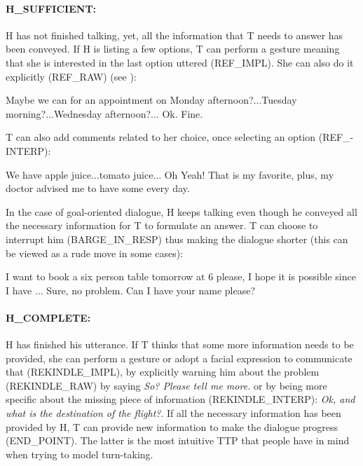                    	\paragraph{H\_SUFFICIENT:} H has not finished talking, yet, all the information that T needs to answer has been conveyed. If H is listing a few options, T can perform a gesture meaning that she is interested in the last option uttered (REF\_IMPL). She can also do it explicitly (REF\_RAW) (see \cite{El-Asri2014a}):
                    
                    	\begin{dialogue}
							 Maybe we can for an appointment on Monday afternoon?...Tuesday morning?...Wednesday afternoon?...
							 Ok. Fine.
						\end{dialogue}
                        
                   	T can also add comments related to her choice, once selecting an option (REF\_-\\INTERP):
                    
                    	\begin{dialogue}
							 We have apple juice...tomato juice...
							 Oh Yeah! That is my favorite, plus, my doctor advised me to have some every day.
						\end{dialogue}
                    
                    In the case of goal-oriented dialogue, H keeps talking even though he conveyed all the necessary information for T to formulate an answer. T can choose to interrupt him (BARGE\_IN\_RESP) thus making the dialogue shorter (this can be viewed as a rude move in some cases):
                    
                 		\begin{dialogue}
							 I want to book a six person table tomorrow at 6 please, I hope it is possible since I have ...
							 Sure, no problem. Can I have your name please?
						\end{dialogue}
                        
                  	\paragraph{H\_COMPLETE:} H has finished his utterance. If T thinks that some more information needs to be provided, she can perform a gesture or adopt a facial expression to communicate that (REKINDLE\_IMPL), by explicitly warning him about the problem (REKINDLE\_RAW) by saying \textit{So? Please tell me more.} or by being more specific about the missing piece of information (REKINDLE\_INTERP): \textit{Ok, and what is the destination of the flight?}. If all the necessary information has been provided by H, T can provide new information to make the dialogue progress (END\_POINT). The latter is the most intuitive TTP that people have in mind when trying to model turn-taking.
                    
